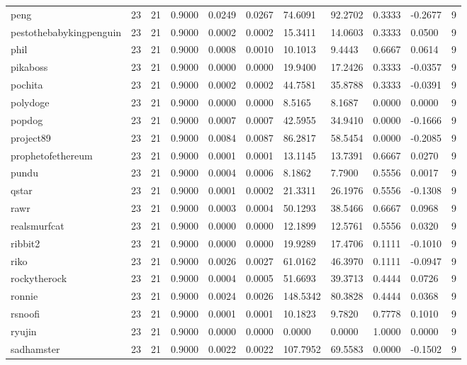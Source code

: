 \begin{table}[htbp]
\begin{tabular}{lllllllllll}
peng & 23 & 21 & 0.9000 & 0.0249 & 0.0267 & 74.6091 & 92.2702 & 0.3333 & -0.2677 & 9 \\
pestothebabykingpenguin & 23 & 21 & 0.9000 & 0.0002 & 0.0002 & 15.3411 & 14.0603 & 0.3333 & 0.0500 & 9 \\
phil & 23 & 21 & 0.9000 & 0.0008 & 0.0010 & 10.1013 & 9.4443 & 0.6667 & 0.0614 & 9 \\
pikaboss & 23 & 21 & 0.9000 & 0.0000 & 0.0000 & 19.9400 & 17.2426 & 0.3333 & -0.0357 & 9 \\
pochita & 23 & 21 & 0.9000 & 0.0002 & 0.0002 & 44.7581 & 35.8788 & 0.3333 & -0.0391 & 9 \\
polydoge & 23 & 21 & 0.9000 & 0.0000 & 0.0000 & 8.5165 & 8.1687 & 0.0000 & 0.0000 & 9 \\
popdog & 23 & 21 & 0.9000 & 0.0007 & 0.0007 & 42.5955 & 34.9410 & 0.0000 & -0.1666 & 9 \\
project89 & 23 & 21 & 0.9000 & 0.0084 & 0.0087 & 86.2817 & 58.5454 & 0.0000 & -0.2085 & 9 \\
prophetofethereum & 23 & 21 & 0.9000 & 0.0001 & 0.0001 & 13.1145 & 13.7391 & 0.6667 & 0.0270 & 9 \\
pundu & 23 & 21 & 0.9000 & 0.0004 & 0.0006 & 8.1862 & 7.7900 & 0.5556 & 0.0017 & 9 \\
qstar & 23 & 21 & 0.9000 & 0.0001 & 0.0002 & 21.3311 & 26.1976 & 0.5556 & -0.1308 & 9 \\
rawr & 23 & 21 & 0.9000 & 0.0003 & 0.0004 & 50.1293 & 38.5466 & 0.6667 & 0.0968 & 9 \\
realsmurfcat & 23 & 21 & 0.9000 & 0.0000 & 0.0000 & 12.1899 & 12.5761 & 0.5556 & 0.0320 & 9 \\
ribbit2 & 23 & 21 & 0.9000 & 0.0000 & 0.0000 & 19.9289 & 17.4706 & 0.1111 & -0.1010 & 9 \\
riko & 23 & 21 & 0.9000 & 0.0026 & 0.0027 & 61.0162 & 46.3970 & 0.1111 & -0.0947 & 9 \\
rockytherock & 23 & 21 & 0.9000 & 0.0004 & 0.0005 & 51.6693 & 39.3713 & 0.4444 & 0.0726 & 9 \\
ronnie & 23 & 21 & 0.9000 & 0.0024 & 0.0026 & 148.5342 & 80.3828 & 0.4444 & 0.0368 & 9 \\
rsnoofi & 23 & 21 & 0.9000 & 0.0001 & 0.0001 & 10.1823 & 9.7820 & 0.7778 & 0.1010 & 9 \\
ryujin & 23 & 21 & 0.9000 & 0.0000 & 0.0000 & 0.0000 & 0.0000 & 1.0000 & 0.0000 & 9 \\
sadhamster & 23 & 21 & 0.9000 & 0.0022 & 0.0022 & 107.7952 & 69.5583 & 0.0000 & -0.1502 & 9 \\

\end{tabular}
\end{table}
